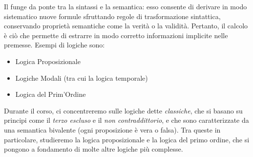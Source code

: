 Il  funge da ponte tra la sintassi e la semantica: esso consente di derivare in modo sistematico nuove formule sfruttando regole di trasformazione sintattica, conservando proprietà semantiche come la verità o la validità. Pertanto, il calcolo è ciò che permette di estrarre in modo corretto informazioni implicite nelle premesse.
Esempi di logiche sono:
\begin{itemize}
  \item Logica Proposizionale
  \item Logiche Modali (tra cui la logica temporale)
  \item Logica del Prim'Ordine
\end{itemize}

Durante il corso, ci concentreremo sulle logiche dette \textit{classiche}, che si basano su principi come il \textit{terzo escluso} e il \textit{non contraddittorio}, e che sono caratterizzate da una semantica bivalente (ogni proposizione è vera o falsa).
Tra queste in particolare, studieremo la logica proposizionale e la logica del primo ordine, che si pongono a fondamento di molte altre logiche più complesse.